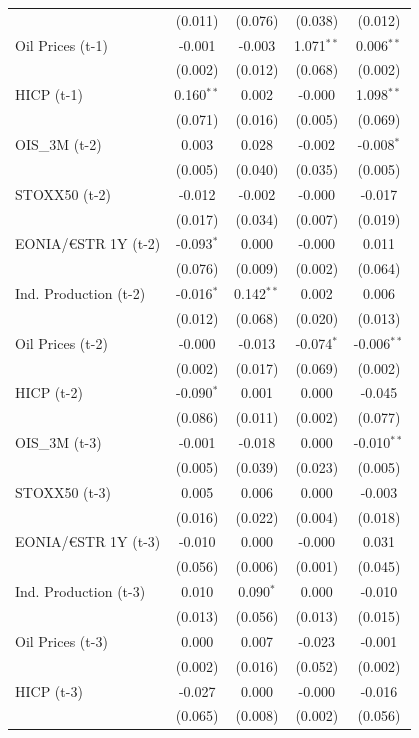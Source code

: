\begin{longtable}[t]{lcccc}
 & (0.011) & (0.076) & (0.038) & (0.012)\\
Oil Prices (t-1) & -0.001 & -0.003 & 1.071$^{**}$ & 0.006$^{**}$\\
 & (0.002) & (0.012) & (0.068) & (0.002)\\
HICP (t-1) & 0.160$^{**}$ & 0.002 & -0.000 & 1.098$^{**}$\\
 & (0.071) & (0.016) & (0.005) & (0.069)\\
OIS\_3M (t-2) & 0.003 & 0.028 & -0.002 & -0.008$^{*}$\\
 & (0.005) & (0.040) & (0.035) & (0.005)\\
STOXX50 (t-2) & -0.012 & -0.002 & -0.000 & -0.017\\
 & (0.017) & (0.034) & (0.007) & (0.019)\\
EONIA/€STR 1Y (t-2) & -0.093$^{*}$ & 0.000 & -0.000 & 0.011\\
 & (0.076) & (0.009) & (0.002) & (0.064)\\
Ind. Production (t-2) & -0.016$^{*}$ & 0.142$^{**}$ & 0.002 & 0.006\\
 & (0.012) & (0.068) & (0.020) & (0.013)\\
Oil Prices (t-2) & -0.000 & -0.013 & -0.074$^{*}$ & -0.006$^{**}$\\
 & (0.002) & (0.017) & (0.069) & (0.002)\\
HICP (t-2) & -0.090$^{*}$ & 0.001 & 0.000 & -0.045\\
 & (0.086) & (0.011) & (0.002) & (0.077)\\
OIS\_3M (t-3) & -0.001 & -0.018 & 0.000 & -0.010$^{**}$\\
 & (0.005) & (0.039) & (0.023) & (0.005)\\
STOXX50 (t-3) & 0.005 & 0.006 & 0.000 & -0.003\\
 & (0.016) & (0.022) & (0.004) & (0.018)\\
EONIA/€STR 1Y (t-3) & -0.010 & 0.000 & -0.000 & 0.031\\
 & (0.056) & (0.006) & (0.001) & (0.045)\\
Ind. Production (t-3) & 0.010 & 0.090$^{*}$ & 0.000 & -0.010\\
 & (0.013) & (0.056) & (0.013) & (0.015)\\
Oil Prices (t-3) & 0.000 & 0.007 & -0.023 & -0.001\\
 & (0.002) & (0.016) & (0.052) & (0.002)\\
HICP (t-3) & -0.027 & 0.000 & -0.000 & -0.016\\
 & (0.065) & (0.008) & (0.002) & (0.056)\\

\end{longtable}
